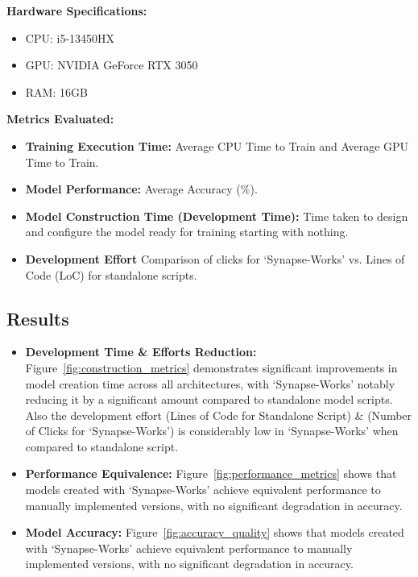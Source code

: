 \documentclass[10pt,conference]{IEEEtran}
\begin{document}
\textbf{Hardware Specifications:}
\begin{itemize}
    \item CPU: i5-13450HX
    \item GPU: NVIDIA GeForce RTX 3050
    \item RAM: 16GB
\end{itemize}

\textbf{Metrics Evaluated:}
\begin{itemize}
    \item \textbf{Training Execution Time: }Average CPU Time to Train and Average GPU Time to Train.
    \item \textbf{Model Performance:} Average Accuracy (\%).
    \item \textbf{Model Construction Time (Development Time):} Time taken to design and configure the model ready for training starting with nothing.
    \item \textbf{Development Effort} Comparison of clicks for `Synapse-Works' vs. Lines of Code (LoC) for standalone scripts.
\end{itemize}

\subsection{Results}
\begin{itemize}
    \item \textbf{Development Time \& Efforts Reduction:} Figure~\ref{fig:construction_metrics}
          demonstrates significant improvements in model creation time across all architectures, with `Synapse-Works' notably reducing it by a significant amount compared to standalone model scripts.
          Also the development effort (Lines of Code for Standalone Script) \& (Number of Clicks for `Synapse-Works') is considerably low in `Synapse-Works' when compared to
          standalone script.
    \item \textbf{Performance Equivalence:} Figure~\ref{fig:performance_metrics} shows that models created with `Synapse-Works' achieve equivalent performance to manually implemented versions, with no significant degradation in accuracy.
    \item \textbf{Model Accuracy:} Figure~\ref{fig:accuracy_quality} shows that models created with `Synapse-Works' achieve equivalent performance to manually implemented versions, with no significant degradation in accuracy.
\end{itemize}
\end{document}
